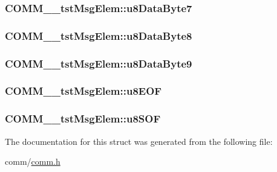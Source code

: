 \subsubsection[{u8\+Data\+Byte7}]{ C\+O\+M\+M\+\_\+\+\_\+tst\+Msg\+Elem\+::u8\+Data\+Byte7}\label{struct_c_o_m_m____tst_msg_elem_aa2e4a71781bfb80976c34ae1af91f16f}
\hypertarget{struct_c_o_m_m____tst_msg_elem_aa391668bc6868d912785116c688d3021}{}
\subsubsection[{u8\+Data\+Byte8}]{ C\+O\+M\+M\+\_\+\+\_\+tst\+Msg\+Elem\+::u8\+Data\+Byte8}\label{struct_c_o_m_m____tst_msg_elem_aa391668bc6868d912785116c688d3021}
\hypertarget{struct_c_o_m_m____tst_msg_elem_a5287dcc32687795d6e1a6a2157ab6c27}{}
\subsubsection[{u8\+Data\+Byte9}]{ C\+O\+M\+M\+\_\+\+\_\+tst\+Msg\+Elem\+::u8\+Data\+Byte9}\label{struct_c_o_m_m____tst_msg_elem_a5287dcc32687795d6e1a6a2157ab6c27}
\hypertarget{struct_c_o_m_m____tst_msg_elem_a2164a12ad73bf87cc70c7fa3fd605f2d}{}
\subsubsection[{u8\+E\+O\+F}]{ C\+O\+M\+M\+\_\+\+\_\+tst\+Msg\+Elem\+::u8\+E\+O\+F}\label{struct_c_o_m_m____tst_msg_elem_a2164a12ad73bf87cc70c7fa3fd605f2d}
\hypertarget{struct_c_o_m_m____tst_msg_elem_a65aaf238c2fe3f2c5d2dd46ad0efae4d}{}
\subsubsection[{u8\+S\+O\+F}]{ C\+O\+M\+M\+\_\+\+\_\+tst\+Msg\+Elem\+::u8\+S\+O\+F}\label{struct_c_o_m_m____tst_msg_elem_a65aaf238c2fe3f2c5d2dd46ad0efae4d}


The documentation for this struct was generated from the following file\+:\begin{DoxyCompactItemize}
\item 
comm/\hyperlink{comm_8h}{comm.\+h}\end{DoxyCompactItemize}
